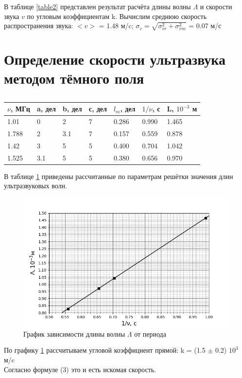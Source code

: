 \documentclass{article}
\begin{document}
В таблице \ref{table2} представлен результат расчёта длины волны $\Lambda$ и скорости звука $v$ по угловым коэффициентам k.
Вычислим среднюю скорость распространения звука: $<v>$ = 1.48 м/c;
$\sigma_v=\sqrt{\sigma_{vr}^2+\sigma_{vm}^2}$ = 0.07 м/с


\section{Определение скорости ультразвука методом тёмного поля}
\begin{table}[h!]
\centering
\caption{}
\label{table3}
\begin{tabular}{|l|l|l|l|l|l|l|}
\hline
$\nu$, МГц & a, дел & b, дел & с, дел & $l_m$, дел & $1/\nu$, с & L, $10^{-3}$ м \\ \hline
1.01       & 0      & 2      & 7      & 0.286      & 0.990      & 1.465          \\ \hline
1.788      & 2      & 3.1    & 7      & 0.157      & 0.559      & 0.878          \\ \hline
1.42       & 3      & 5      & 5      & 0.400      & 0.704      & 1.042          \\ \hline
1.525      & 3.1    & 5      & 5      & 0.380      & 0.656      & 0.970          \\ \hline
\end{tabular}
\end{table}
В таблице \ref{table3} приведены рассчитанные по параметрам решётки значения длин ультразвуковых волн.
\begin{figure}[h!]
  \includegraphics[width=\linewidth]{Figure_2.png}
  \caption{График зависимости длины волны $\Lambda$ от периода}
  \label{fig:graph2}
\end{figure}
По графику \ref{fig:graph2} рассчитываем угловой коэффициент прямой: k = (1.5 $\pm$ 0.2) $10^3$ м/c\\
Согласно формуле (3) это и есть искомая скорость.
\end{document}

